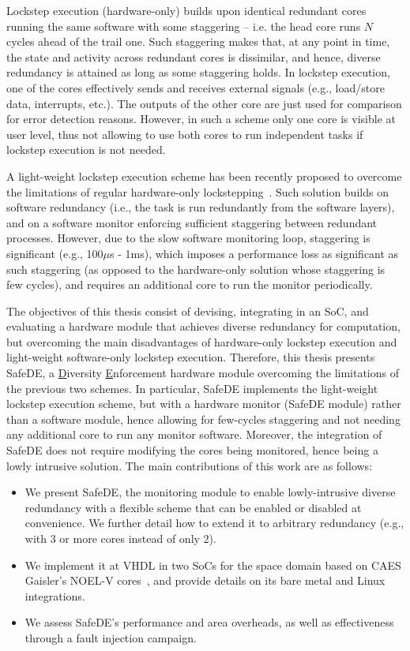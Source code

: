 Lockstep execution (hardware-only) builds upon identical redundant cores running the same software with some staggering -- i.e. the head core runs $N$ cycles ahead of the trail one. Such staggering makes that, at any point in time, the state and activity across redundant cores is dissimilar, and hence, diverse redundancy is attained as long as some staggering holds.
In lockstep execution, one of the cores effectively sends and receives external signals (e.g., load/store data, interrupts, etc.). The outputs of the other core are just used for comparison for error detection reasons. However, in such a scheme only one core is visible at user level, thus not allowing to use both cores to run independent tasks if lockstep execution is not needed.

A light-weight lockstep execution scheme has been recently proposed to overcome the limitations of regular hardware-only lockstepping~\cite{alcaide2020software}. Such solution builds on software redundancy (i.e., the task is run redundantly from the software layers), and on a software monitor enforcing sufficient staggering between redundant processes. However, due to the slow software monitoring loop, staggering is significant (e.g., 100$\mu$s - 1ms), which imposes a performance loss as significant as such staggering (as opposed to the hardware-only solution whose staggering is few cycles), and requires an additional core to run the monitor periodically.

The objectives of this thesis consist of devising, integrating in an SoC, and evaluating a hardware module that achieves diverse redundancy for computation, but overcoming the main disadvantages of hardware-only lockstep execution and light-weight software-only lockstep execution. 
Therefore, this thesis presents SafeDE, a \underline{D}iversity \underline{E}nforcement hardware module overcoming the limitations of the previous two schemes. In particular, SafeDE implements the light-weight lockstep execution scheme, but with a hardware monitor (SafeDE module) rather than a software module, hence allowing for few-cycles staggering and not needing any additional core to run any monitor software. Moreover, the integration of SafeDE does not require modifying the cores being monitored, hence being a lowly intrusive solution.
The main contributions of this work are as follows:
\begin{itemize}
\item We present SafeDE, the monitoring module to enable lowly-intrusive diverse redundancy with a flexible scheme that can be enabled or disabled at convenience. We further detail how to extend it to arbitrary redundancy (e.g., with 3 or more cores instead of only 2).
\item We implement it at VHDL in two SoCs for the space domain based on CAES Gaisler's NOEL-V cores~\cite{gomez2020risc,SELENEgit}, and provide details on its bare metal and Linux integrations.
\item We assess SafeDE's performance and area overheads, as well as effectiveness through a fault injection campaign.
\end{itemize}



